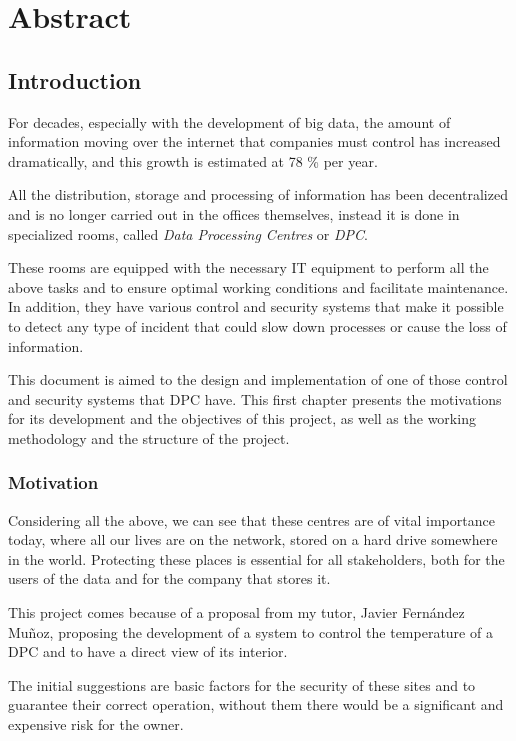 \chapter{Abstract}\label{ch:abstract}
\section{Introduction}\label{sec:introduction}
For decades, especially with the development of big data, the amount of information moving over the internet that companies must control has increased dramatically, and this growth is estimated at 78 \% per year.

All the distribution, storage and processing of information has been decentralized and is no longer carried out in the offices themselves, instead it is done in specialized rooms, called \textit{Data Processing Centres} or \textit{DPC}.

These rooms are equipped with the necessary IT equipment to perform all the above tasks and to ensure optimal working conditions and facilitate maintenance. In addition, they have various control and security systems that make it possible to detect any type of incident that could slow down processes or cause the loss of information.

This document is aimed to the design and implementation of one of those control and security systems that DPC have. This first chapter presents the motivations for its development and the objectives of this project, as well as the working methodology and the structure of the project.

\subsection{Motivation}\label{subsec:motivation}
Considering all the above, we can see that these centres are of vital importance today, where all our lives are on the network, stored on a hard drive somewhere in the world. Protecting these places is essential for all stakeholders, both for the users of the data and for the company that stores it.

This project comes because of a proposal from my tutor, Javier Fernández Muñoz, proposing the development of a system to control the temperature of a DPC and to have a direct view of its interior.

The initial suggestions are basic factors for the security of these sites and to guarantee their correct operation, without them there would be a significant and expensive risk for the owner.

